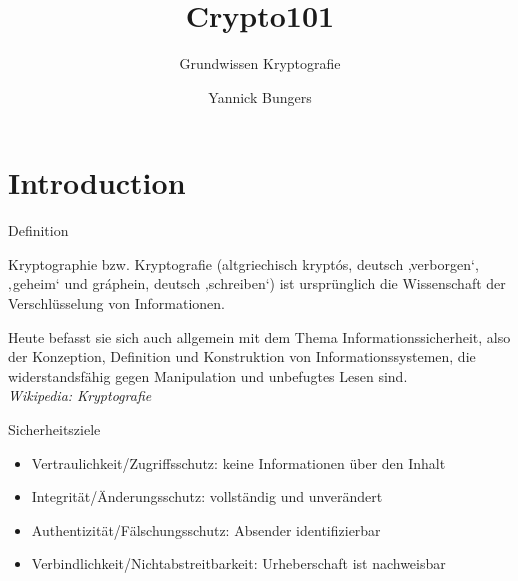 \documentclass[10pt]{beamer}
\title{Crypto101}
\subtitle{Grundwissen Kryptografie}
\date{}
\author{Yannick Bungers}
\begin{document}
	
	\maketitle
	
	
	\section[Ziele von Kryptografie]{Introduction}
	
	\begin{frame}[fragile]{Definition}
		
		Kryptographie bzw. Kryptografie (altgriechisch kryptós, deutsch ‚verborgen‘, ‚geheim‘ und gráphein, deutsch ‚schreiben‘) ist ursprünglich die Wissenschaft der Verschlüsselung von Informationen.
		
		Heute befasst sie sich auch allgemein mit dem Thema Informationssicherheit, also der Konzeption, Definition und Konstruktion von Informationssystemen, die widerstandsfähig gegen Manipulation und unbefugtes Lesen sind.\\
		\vspace{0.35cm} 
		\textit{Wikipedia: Kryptografie}
		
	\end{frame}
	\begin{frame}[fragile]{Sicherheitsziele}
		\begin{itemize}
			\item \alert{Vertraulichkeit/Zugriffsschutz}: keine Informationen über den Inhalt
			\vspace{0.5cm}
			\item \alert{Integrität/Änderungsschutz}: vollständig und unverändert
			\vspace{0.5cm}
			\item \alert{Authentizität/Fälschungsschutz}: Absender identifizierbar
			\vspace{0.5cm}
			\item \alert{Verbindlichkeit/Nichtabstreitbarkeit}: Urheberschaft ist nachweisbar
		\end{itemize}
		
	\end{frame}
	
\end{document}
